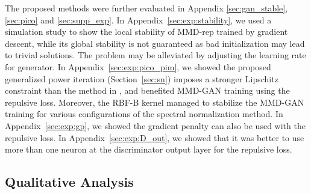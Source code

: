 \documentclass{article} %
\theoremstyle{plain}
\newtheorem*{proposition 1*}{Proposition 1}
\begin{document}
The proposed methods were further evaluated in Appendix \ref{sec:gan_stable}, \ref{sec:pico} and \ref{sec:supp_exp}. In Appendix~\ref{sec:exp:stability}, we used a simulation study to show the local stability of MMD-rep trained by gradient descent, while its global stability is not guaranteed as bad initialization may lead to trivial solutions. The problem may be alleviated by adjusting the learning rate for generator. In Appendix~\ref{sec:exp:pico_pim}, we showed the proposed generalized power iteration (Section~\ref{sec:sn}) imposes a stronger Lipschitz constraint than the method in \cite{spectral}, and benefited MMD-GAN training using the repulsive loss. Moreover, the RBF-B kernel managed to stabilize the MMD-GAN training for various configurations of the spectral normalization method. In Appendix~\ref{sec:exp:gp}, we showed the gradient penalty can also be used with the repulsive loss. In Appendix~\ref{sec:exp:D_out}, we showed that it was better to use more than one neuron at the discriminator output layer for the repulsive loss.

\subsection{Qualitative Analysis}
\label{sec:exp:unsupervised_qualitative}
\end{document}
